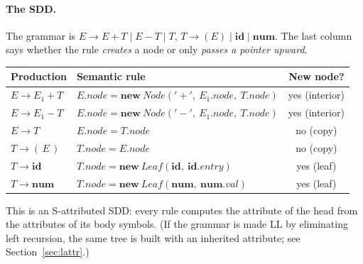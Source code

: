 \documentclass[11pt,a4paper]{article}
\newcommand{\at}[2]{\ensuremath{#1.\mathit{#2}}}
\newcommand{\tok}[1]{\ensuremath{\mathtt{#1}}}
\begin{document}
\paragraph{The SDD.} The grammar is $E\to E+T\mid E-T\mid T$, $T\to(E)\mid\mathbf{id}\mid\mathbf{num}$. The last column says whether the rule \emph{creates} a node or only \emph{passes a pointer upward}.
\begin{center}
\small
\begin{tabular}{@{}l l c@{}}
\toprule
\textbf{Production} & \textbf{Semantic rule} & \textbf{New node?} \\ \midrule
$E \to E_1 + T$ & $\at{E}{node} = \mathbf{new}\ \mathit{Node}(\tok{'+'},\ \at{E_1}{node},\ \at{T}{node})$ & yes (interior) \\
$E \to E_1 - T$ & $\at{E}{node} = \mathbf{new}\ \mathit{Node}(\tok{'-'},\ \at{E_1}{node},\ \at{T}{node})$ & yes (interior) \\
$E \to T$ & $\at{E}{node} = \at{T}{node}$ & no (copy) \\
$T \to (\,E\,)$ & $\at{T}{node} = \at{E}{node}$ & no (copy) \\
$T \to \mathbf{id}$ & $\at{T}{node} = \mathbf{new}\ \mathit{Leaf}(\mathbf{id},\ \at{\mathbf{id}}{entry})$ & yes (leaf) \\
$T \to \mathbf{num}$ & $\at{T}{node} = \mathbf{new}\ \mathit{Leaf}(\mathbf{num},\ \at{\mathbf{num}}{val})$ & yes (leaf) \\ \bottomrule
\end{tabular}
\end{center}
This is an S-attributed SDD: every rule computes the attribute of the head from the attributes of its body symbols. (If the grammar is made LL by eliminating left recursion, the same tree is built with an inherited attribute; see Section~\ref{sec:lattr}.)
\end{document}
